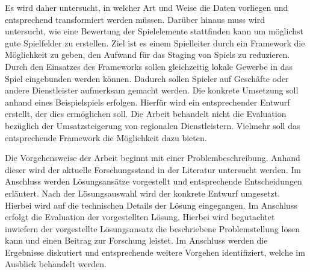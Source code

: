 Es wird daher untersucht, in welcher Art und Weise die Daten vorliegen und entsprechend transformiert werden müssen.
Darüber hinaus muss wird untersucht, wie eine Bewertung der Spielelemente stattfinden kann um möglichst gute Spielfelder zu erstellen.
Ziel ist es einem Spielleiter durch ein Framework die Möglichkeit zu geben, den Aufwand für das Staging von Spiels zu reduzieren. Durch den Einsatzes des Frameworks sollen gleichzeitig lokale Gewerbe in das Spiel eingebunden werden können. Dadurch sollen Spieler auf Geschäfte oder andere Dienstleister aufmerksam gemacht werden.
Die konkrete Umsetzung soll anhand eines Beispielspiels erfolgen.
Hierfür wird ein entsprechender Entwurf erstellt, der dies ermöglichen soll.
Die Arbeit behandelt nicht die Evaluation bezüglich der Umsatzsteigerung von regionalen Dienstleistern. Vielmehr soll das entsprechende Framework die Möglichkeit dazu bieten.

Die Vorgehensweise der Arbeit beginnt mit einer Problembeschreibung. Anhand dieser wird der aktuelle Forschungsstand in der Literatur untersucht werden. Im Anschluss werden Lösungsansätze vorgestellt und entsprechende Entscheidungen erläutert. Nach der Lösungsauswahl wird der konkrete Entwurf umgesetzt. Hierbei wird auf die technischen Details der Lösung eingegangen. Im Anschluss erfolgt die Evaluation der vorgestellten Lösung. Hierbei wird begutachtet inwiefern der vorgestellte Lösungsansatz die beschriebene Problemstellung lösen kann und einen Beitrag zur Forschung leistet. Im Anschluss werden die Ergebnisse diskutiert und entsprechende weitere Vorgehen identifiziert, welche im Ausblick behandelt werden.

